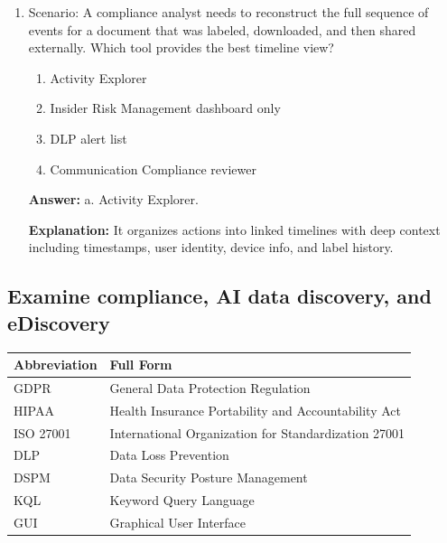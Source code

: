 \documentclass[10pt]{article}
\begin{document}
\begin{enumerate}[leftmargin=*]
\textbf{Explanation:} DLP can block or alert on sharing to personal domains while Insider Risk Management provides behavioral context.

\item Scenario: A compliance analyst needs to reconstruct the full sequence of events for a document that was labeled, downloaded, and then shared externally. Which tool provides the best timeline view?
\begin{enumerate}[label=\alph*., leftmargin=1.5em]
\item Activity Explorer
\item Insider Risk Management dashboard only
\item DLP alert list
\item Communication Compliance reviewer
\end{enumerate}
\textbf{Answer:} a. Activity Explorer.

\textbf{Explanation:} It organizes actions into linked timelines with deep context including timestamps, user identity, device info, and label history.

\end{enumerate}
\clearpage

\subsection{Examine compliance, AI data discovery, and eDiscovery}

\begin{center}
\begin{tabular}{>{\raggedright\arraybackslash}p{} >{\raggedright\arraybackslash}p{}}
\toprule
\textbf{Abbreviation} & \textbf{Full Form} \\
\midrule
GDPR & General Data Protection Regulation \\
HIPAA & Health Insurance Portability and Accountability Act \\
ISO 27001 & International Organization for Standardization 27001 \\
DLP & Data Loss Prevention \\
DSPM & Data Security Posture Management \\
KQL & Keyword Query Language \\
GUI & Graphical User Interface \\
\end{tabular}
\end{center}
\end{document}
